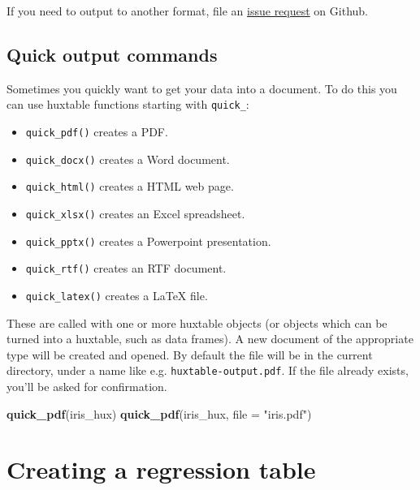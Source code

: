 \documentclass[]{article}
\newenvironment{Shaded}{\begin{snugshade}}{\end{snugshade}}
\newcommand{\DataTypeTok}[1]{\textcolor[rgb]{0.13,0.29,0.53}{#1}}
\newcommand{\KeywordTok}[1]{\textcolor[rgb]{0.13,0.29,0.53}{\textbf{#1}}}
\newcommand{\NormalTok}[1]{#1}
\newcommand{\StringTok}[1]{\textcolor[rgb]{0.31,0.60,0.02}{#1}}
\providecommand{\tightlist}{%
  \setlength{\itemsep}{0pt}\setlength{\parskip}{0pt}}
\begin{document}
\FloatBarrier

If you need to output to another format, file an
\href{https://github.com/hughjonesd/huxtable}{issue request} on Github.

\hypertarget{quick-output-commands}{%
\subsection{Quick output commands}\label{quick-output-commands}}

Sometimes you quickly want to get your data into a document. To do this
you can use huxtable functions starting with \texttt{quick\_}:

\begin{itemize}
\tightlist
\item
  \texttt{quick\_pdf()} creates a PDF.
\item
  \texttt{quick\_docx()} creates a Word document.
\item
  \texttt{quick\_html()} creates a HTML web page.
\item
  \texttt{quick\_xlsx()} creates an Excel spreadsheet.
\item
  \texttt{quick\_pptx()} creates a Powerpoint presentation.
\item
  \texttt{quick\_rtf()} creates an RTF document.
\item
  \texttt{quick\_latex()} creates a LaTeX file.
\end{itemize}

These are called with one or more huxtable objects (or objects which can
be turned into a huxtable, such as data frames). A new document of the
appropriate type will be created and opened. By default the file will be
in the current directory, under a name like e.g.
\texttt{huxtable-output.pdf}. If the file already exists, you'll be
asked for confirmation.

\begin{Shaded}
\begin{Highlighting}[]
\KeywordTok{quick_pdf}\NormalTok{(iris_hux) }
\KeywordTok{quick_pdf}\NormalTok{(iris_hux, }\DataTypeTok{file =} \StringTok{"iris.pdf"}\NormalTok{)}
\end{Highlighting}
\end{Shaded}

\FloatBarrier

\hypertarget{creating-a-regression-table}{%
\section{Creating a regression
table}\label{creating-a-regression-table}}
\end{document}
